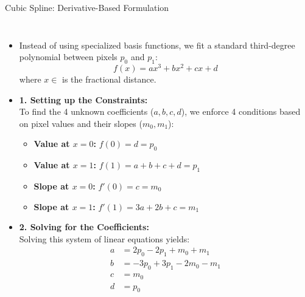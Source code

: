 \documentclass[aspectratio=169,10pt]{beamer}
\begin{document}
\begin{frame}{Cubic Spline: Derivative-Based Formulation}
\begin{columns}[T,onlytextwidth]
\small
\begin{itemize}
    \item Instead of using specialized basis functions, we fit a standard third-degree polynomial between pixels $p_0$ and $p_1$:
    \[ f(x) = ax^3 + bx^2 + cx + d \]
    where $x \in$ is the fractional distance.

    \item \textbf{1. Setting up the Constraints:} \\
    To find the 4 unknown coefficients ($a, b, c, d$), we enforce 4 conditions based on pixel values and their slopes ($m_0, m_1$):
    \begin{itemize}
        \scriptsize
        \item \textbf{Value at $x=0$:} $f(0) = d = p_0$
        \item \textbf{Value at $x=1$:} $f(1) = a + b + c + d = p_1$
        \item \textbf{Slope at $x=0$:} $f'(0) = c = m_0$
        \item \textbf{Slope at $x=1$:} $f'(1) = 3a + 2b + c = m_1$
    \end{itemize}

    \small
    \item \textbf{2. Solving for the Coefficients:} \\
    Solving this system of linear equations yields:
    \scriptsize
    \begin{align*}
        a &= 2p_0 - 2p_1 + m_0 + m_1 \\
        b &= -3p_0 + 3p_1 - 2m_0 - m_1 \\
        c &= m_0 \\
        d &= p_0
    \end{align*}

\end{itemize}

\centering
{}
\end{columns}
\end{frame}
\end{document}
